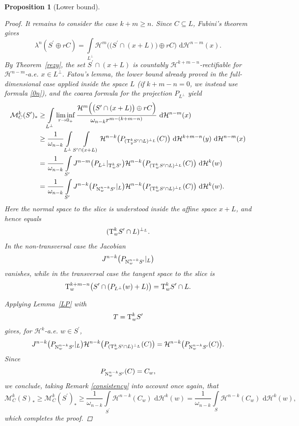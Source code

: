 \documentclass[pdflatex,sn-mathphys-num]{sn-jnl}
\theoremstyle{plain}
\newtheorem{proposition}[theorem]{Proposition}
\theoremstyle{definition}
\newcommand{\dH}[1]{\,\mathrm d\mathcal{H}^{#1}}
\begin{document}
\begin{proposition}[Lower bound]
\begin{proof}
It remains to consider the case $k+m\geq n$. Since $C\subseteq L$, Fubini's
theorem gives
\[
\lambda^n(S^{\prime}\oplus rC)
=
\int\limits_{L^\perp}
\mathcal H^m\Big(\big(S^{\prime}\cap(x+L)\big)\oplus rC\Big)\,\dH{n-m}(x).
\]
By Theorem~\ref{rezy}, the set $S^{\prime}\cap(x+L)$ is countably
$\mathcal H^{k+m-n}$-rectifiable for $\mathcal H^{n-m}$-a.e.
$x\in L^\perp$. Fatou's lemma, the lower bound already proved in the
full-dimensional case applied inside the space $L$ (if \(k+m-n=0\), we instead use formula \eqref{0n}), and the coarea formula
for the projection $P_{L^\perp}$ yield
\[
\begin{split}
\mathcal M_C^k(S^{\prime})_*
&\geq
\int\limits_{L^\perp}
\liminf_{r\to0_+}
\frac{
\mathcal H^m\Big(\big(S^{\prime}\cap(x+L)\big)\oplus rC\Big)}
{\omega_{n-k}r^{m-(k+m-n)}}
\,\dH{n-m}(x)
\\
&\geq
\frac{1}{\omega_{n-k}}
\int\limits_{L^\perp}
\int\limits_{S^{\prime}\cap(x+L)}
\mathcal H^{n-k}
\big(P_{(\textup T_y^kS^{\prime}\cap L)^{\perp_L}}(C)\big)
\,\dH{k+m-n}(y)\,\dH{n-m}(x)
\\
&=
\frac{1}{\omega_{n-k}}
\int\limits_{S^{\prime}}
J^{n-m}\big(P_{L^\perp}|_{\textup T_w^kS^{\prime}}\big)
\mathcal H^{n-k}
\big(P_{(\textup T_w^kS^{\prime}\cap L)^{\perp_L}}(C)\big)
\,\dH{k}(w)
\\
&=
\frac{1}{\omega_{n-k}}
\int\limits_{S^{\prime}}
J^{n-k}\big(P_{\textup N_w^{n-k}S^{\prime}}|_L\big)
\mathcal H^{n-k}
\big(P_{(\textup T_w^kS^{\prime}\cap L)^{\perp_L}}(C)\big)
\,\dH{k}(w).
\end{split}
\]
Here the normal space to the slice is understood inside the affine space
$x+L$, and hence equals
\[
(\textup T_w^kS^{\prime}\cap L)^{\perp_L}.
\]
In the non-transversal case the Jacobian
\[
J^{n-k}\big(P_{\textup N_w^{n-k}S^{\prime}}|_L\big)
\]
vanishes, while in the transversal case the tangent space to the slice is
\[
\textup T_w^{k+m-n}\big(S^{\prime}\cap(P_{L^\perp}(w)+L)\big)
=
\textup T_w^kS^{\prime}\cap L.
\]

Applying Lemma~\ref{LP} with
\[
T=\textup T_w^kS^{\prime}
\]
gives, for $\mathcal H^k$-a.e. $w\in S^{\prime}$,
\[
J^{n-k}\big(P_{\textup N_w^{n-k}S^{\prime}}|_L\big)
\mathcal H^{n-k}
\big(P_{(\textup T_w^kS^{\prime}\cap L)^{\perp_L}}(C)\big)
=
\mathcal H^{n-k}\big(P_{\textup N_w^{n-k}S^{\prime}}(C)\big).
\]
Since
\[
P_{\textup N_w^{n-k}S^{\prime}}(C)=C_w,
\]
we conclude, taking Remark \ref{consistency} into account once again, that
\[
\mathcal M_C^k(S)_*\geq \mathcal M_C^k(S^{\prime})_*
\geq
\frac{1}{\omega_{n-k}}
\int\limits_{S^{\prime}}\mathcal H^{n-k}(C_w)\,\dH{k}(w)=\frac{1}{\omega_{n-k}}
\int\limits_{S}\mathcal H^{n-k}(C_w)\,\dH{k}(w),
\]
which completes the proof.
\end{proof}
\end{proposition}
\end{document}
